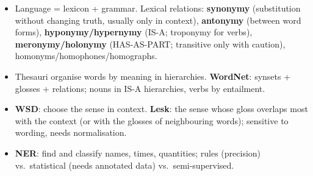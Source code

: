 \begin{nbsummary}
\begin{itemize}[nosep]
  \item Language = lexicon + grammar. Lexical relations: \textbf{synonymy} (substitution
        without changing truth, usually only in context), \textbf{antonymy} (between word
        forms), \textbf{hyponymy/hypernymy} (IS-A; troponymy for verbs),
        \textbf{meronymy/holonymy} (HAS-AS-PART; transitive only with caution),
        homonyms/homophones/homographs.
  \item Thesauri organise words by meaning in hierarchies. \textbf{WordNet}: synsets +
        glosses + relations; nouns in IS-A hierarchies, verbs by entailment.
  \item \textbf{WSD}: choose the sense in context. \textbf{Lesk}: the sense whose gloss
        overlaps most with the context (or with the glosses of neighbouring words);
        sensitive to wording, needs normalisation.
  \item \textbf{NER}: find and classify names, times, quantities; rules (precision) vs.\
        statistical (needs annotated data) vs.\ semi-supervised.
\end{itemize}
\end{nbsummary}
